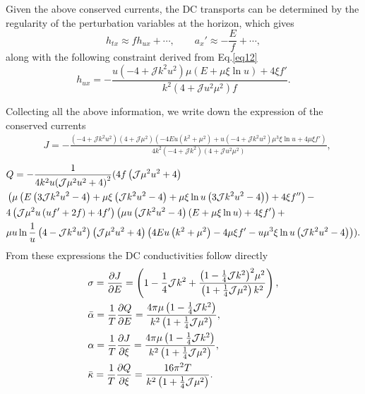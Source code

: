 \documentclass[preprint,onecolumn,nofootinbib]{revtex4}
\begin{document}
Given the above conserved currents, the DC transports can be determined by the regularity of the perturbation variables at the horizon, which gives
\begin{equation}
h_{tx}\approx f h_{ux}+\cdots,\qquad a_x'\approx -\frac{E}{f}+\cdots,
\end{equation}
along with the following constraint derived from Eq.\eqref{eq12}
\begin{equation}
	h_{u x}= - \frac{{u\left( { - 4 + \mathcal{J}{k^2}{u^2}} \right)\mu \left( {E + \mu \xi \ln u} \right) + 4\xi f'}}{{{k^2}\left( {4 + \mathcal{J}{u^2}{\mu ^2}} \right)f}}.
	\label{constraint}
\end{equation}

Collecting all the above information, we write down the expression of the conserved currents
\begin{align}
	&J = - \frac{{\left( { - 4 + \mathcal{J}{k^2}{u^2}} \right)\left( {4 + \mathcal{J}{\mu ^2}} \right)\left( { - 4Eu\left( {{k^2} + {\mu ^2}} \right) + u\left( { - 4 + \mathcal{J}{k^2}{u^2}} \right){\mu ^3}\xi \ln u + 4\mu \xi f'} \right)}}{{4{k^2}\left( { - 4 + \mathcal{J}{k^2}} \right)\left( {4 + \mathcal{J}{u^2}{\mu ^2}} \right)}},
\end{align}	
\begin{align}
	&Q =  - \frac{1}{{4{k^2}u{{\left( {{\cal J}{\mu ^2}{u^2} + 4} \right)}^2}}}(4f\left( {{\cal J}{\mu ^2}{u^2} + 4} \right)\nonumber\\
	&\left( {\mu \left( {E\left( {3{\cal J}{k^2}{u^2} - 4} \right) + \mu \xi \left( {{\cal J}{k^2}{u^2} - 4} \right) + \mu \xi \ln u\left( {3{\cal J}{k^2}{u^2} - 4} \right)} \right) + 4\xi f''} \right) -\nonumber \\
	&4\left( {{\cal J}{\mu ^2}u\left( {uf' + 2f} \right) + 4f'} \right)\left( {\mu u\left( {{\cal J}{k^2}{u^2} - 4} \right)(E + \mu \xi \ln u) + 4\xi f'} \right) +\nonumber\\
	&\mu u\ln \frac{1}{u}\left( {4 - {\cal J}{k^2}{u^2}} \right)\left( {{\cal J}{\mu ^2}{u^2} + 4} \right)\left( {4Eu\left( {{k^2} + {\mu ^2}} \right) - 4\mu \xi f' - u{\mu ^3}\xi \ln u\left( {{\cal J}{k^2}{u^2} - 4} \right)} \right)).
\end{align}
From these expressions the DC conductivities follow directly 
\begin{align}
	&\sigma  = \frac{{\partial J}}{{\partial {E}}} = \left( {1 - \frac{1}{4}{\cal J}{k^2} + \frac{{{{\left( {1 - \frac{1}{4}{\cal J}{k^2}} \right)}^2}{\mu ^2}}}{{\left( {1 + \frac{1}{4}{\cal J}{\mu ^2}} \right){k^2}}}} \right),\\
	&\bar \alpha  = \frac{1}{T}\frac{{\partial Q}}{{\partial {E}}} = \frac{{4\pi \mu \left( {1 - \frac{1}{4}{\cal J}{k^2}} \right)}}{{{k^2}\left( {1 + \frac{1}{4}{\cal J}{\mu ^2}} \right)}},\\
	&\alpha  = \frac{1}{T}\frac{{\partial J}}{{\partial \xi }} = \frac{{4\pi \mu \left( {1 - \frac{1}{4}{\cal J}{k^2}} \right)}}{{{k^2}\left( {1 + \frac{1}{4}{\cal J}{\mu ^2}} \right)}},\\
	&\bar \kappa  = \frac{1}{T}\frac{{\partial Q}}{{\partial \xi }} = \frac{{16{\pi ^2}T}}{{{k^2}\left( {1 + \frac{1}{4}{\cal J}{\mu ^2}} \right)}}\label{DC1v0}.
\end{align}
\end{document}

